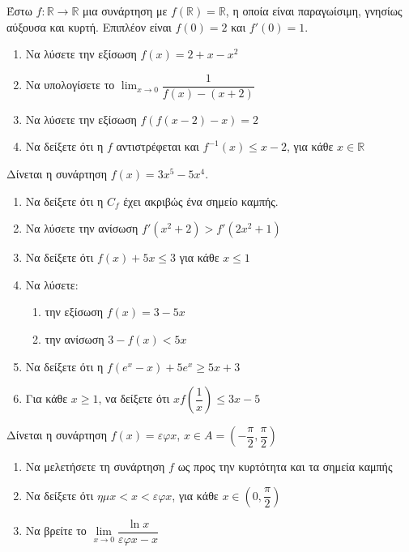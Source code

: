 \documentclass{../presentation}
\begin{document}
\begin{askisi}
  Έστω $f:\mathbb{R}\to\mathbb{R}$ μια συνάρτηση με $f(\mathbb{R})=\mathbb{R}$, η οποία είναι παραγωίσιμη, γνησίως αύξουσα και κυρτή. Επιπλέον είναι $f(0)=2$ και $f'(0)=1$.
  \begin{enumerate}[<+->]
    \item Να λύσετε την εξίσωση $f(x)=2+x-x^2$
    \item Να υπολογίσετε το $\lim_{x\to 0}\dfrac{1}{f(x)-(x+2)}$
    \item Να λύσετε την εξίσωση $f\left(f(x-2)-x\right)=2$
    \item Να δείξετε ότι η $f$ αντιστρέφεται και $f^{-1}(x)\le x-2$, για κάθε $x\in \mathbb{R}$
  \end{enumerate}
\end{askisi}

\begin{askisi}
  Δίνεται η συνάρτηση $f(x)=3x^5-5x^4$.
  \begin{enumerate}[<+->]
    \item Να δείξετε ότι η $C_f$ έχει ακριβώς ένα σημείο καμπής.
    \item Να λύσετε την ανίσωση $f'(x^2+2)>f'(2x^2+1)$
    \item Να δείξετε ότι $f(x)+5x\le 3$ για κάθε $x\le 1$
    \item Να λύσετε:
          \begin{enumerate}[<+->]
            \item την εξίσωση $f(x)=3-5x$
            \item την ανίσωση $3-f(x)< 5x$
          \end{enumerate}
    \item Να δείξετε ότι η $f(e^x-x)+5e^x \ge 5x+3$
    \item Για κάθε $x\ge 1$, να δείξετε ότι $xf \left( \dfrac{1}{x} \right) \le 3x-5$
  \end{enumerate}
\end{askisi}

\begin{askisi}
  Δίνεται η συνάρτηση $f(x)=εφx$, $x\in A=\left( -\dfrac{π}{2},\dfrac{π}{2} \right)$
  \begin{enumerate}[<+->]
    \item Να μελετήσετε τη συνάρτηση $f$ ως προς την κυρτότητα και τα σημεία καμπής
    \item Να δείξετε ότι $ημx<x<εφx$, για κάθε $x\in \left( 0 , \dfrac{π}{2} \right)$
    \item Να βρείτε το $\lim\limits_{x\to 0}\dfrac{\ln x}{εφx-x}$
  \end{enumerate}
\end{askisi}
\end{document}
